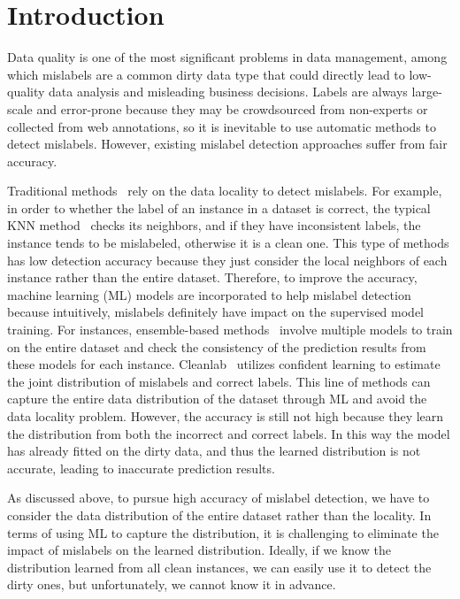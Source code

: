 \section{Introduction} 
\label{sec:intro}
Data quality is one of the most significant problems in data management, among which mislabels are a common dirty data type that could directly lead to  low-quality data analysis  and misleading business decisions. Labels are always large-scale and error-prone because they may be crowdsourced from non-experts or collected from web annotations, so it is inevitable to use automatic methods to detect mislabels. However, existing mislabel detection approaches suffer from fair accuracy.


 Traditional methods~\cite{} rely on the data locality to detect mislabels. For example, in order to whether the label of an instance in a dataset is correct, the typical KNN method~\cite{} checks its neighbors, and if they have inconsistent labels, the instance tends to be mislabeled, otherwise it is a clean one. This type of methods has low detection accuracy because they just consider the local neighbors of each instance rather than the entire dataset. Therefore, to improve the accuracy, machine learning (ML) models are incorporated to help mislabel detection~\cite{} because intuitively,  mislabels definitely have impact on the supervised model training. For instances, ensemble-based methods~\cite{} involve multiple models to train on the entire dataset and check the consistency of the prediction results from these models for each instance. Cleanlab~\cite{} utilizes confident learning to estimate the joint distribution of mislabels and correct labels. This line of methods can capture the entire data distribution of the dataset through ML and avoid the data locality problem. However, the accuracy is still not high because they learn the distribution from both the incorrect and correct labels. In this way the model has already fitted on the dirty data, and thus the learned distribution is not accurate, leading to inaccurate prediction results.


 As discussed above, to pursue high accuracy of mislabel detection, we have to consider the data distribution of the entire dataset rather than the locality. In terms of using ML to capture the distribution, it is challenging to eliminate the impact of mislabels on the learned distribution. Ideally, if we know the distribution learned from all clean instances, we can easily use it to detect the dirty ones, but unfortunately, we cannot know it in advance.

